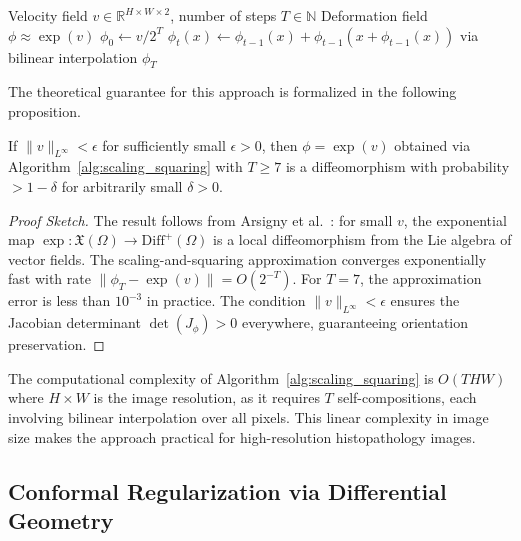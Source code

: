 \begin{algorithm}[t]
\caption{Scaling-and-Squaring for Diffeomorphic Integration}
\label{alg:scaling_squaring}
\begin{algorithmic}[1]
\REQUIRE Velocity field $v \in \mathbb{R}^{H \times W \times 2}$, number of steps $T \in \mathbb{N}$
\ENSURE Deformation field $\phi \approx \exp(v)$
\STATE $\phi_0 \leftarrow v / 2^T$
    \STATE $\phi_t(x) \leftarrow \phi_{t-1}(x) + \phi_{t-1}(x + \phi_{t-1}(x))$ via bilinear interpolation
\ENDFOR
\RETURN $\phi_T$
\end{algorithmic}
\end{algorithm}

The theoretical guarantee for this approach is formalized in the following proposition.

\begin{proposition}
\label{prop:diffeomorphism}
If $\|v\|_{L^\infty} < \epsilon$ for sufficiently small $\epsilon > 0$, then $\phi = \exp(v)$ obtained via Algorithm~\ref{alg:scaling_squaring} with $T \geq 7$ is a diffeomorphism with probability $> 1 - \delta$ for arbitrarily small $\delta > 0$.
\end{proposition}

\begin{proof}[Proof Sketch]
The result follows from Arsigny et al.~\cite{arsigny2006logdiff}: for small $v$, the exponential map $\exp: \mathfrak{X}(\Omega) \rightarrow \text{Diff}^+(\Omega)$ is a local diffeomorphism from the Lie algebra of vector fields. The scaling-and-squaring approximation converges exponentially fast with rate $\|\phi_T - \exp(v)\| = O(2^{-T})$. For $T=7$, the approximation error is less than $10^{-3}$ in practice. The condition $\|v\|_{L^\infty} < \epsilon$ ensures the Jacobian determinant $\det(J_\phi) > 0$ everywhere, guaranteeing orientation preservation.
\end{proof}

The computational complexity of Algorithm~\ref{alg:scaling_squaring} is $O(THW)$ where $H \times W$ is the image resolution, as it requires $T$ self-compositions, each involving bilinear interpolation over all pixels. This linear complexity in image size makes the approach practical for high-resolution histopathology images.

\subsection{Conformal Regularization via Differential Geometry}
\label{subsec:conformal}

